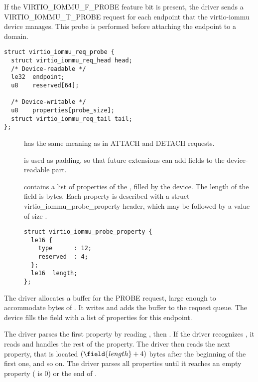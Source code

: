 If the VIRTIO_IOMMU_F_PROBE feature bit is present, the driver sends a
VIRTIO_IOMMU_T_PROBE request for each endpoint that the virtio-iommu
device manages. This probe is performed before attaching the endpoint to
a domain.

\begin{lstlisting}
struct virtio_iommu_req_probe {
  struct virtio_iommu_req_head head;
  /* Device-readable */
  le32  endpoint;
  u8    reserved[64];

  /* Device-writable */
  u8    properties[probe_size];
  struct virtio_iommu_req_tail tail;
};
\end{lstlisting}

\begin{description}
\item[] has the same meaning as in ATTACH and DETACH
  requests.

\item[] is used as padding, so that future extensions can
  add fields to the device-readable part.

\item[] contains a list of properties of the
  , filled by the device. The length of the
   field is  bytes. Each property is
  described with a struct virtio_iommu_probe_property header, which may be
  followed by a value of size .

\begin{lstlisting}
struct virtio_iommu_probe_property {
  le16 {
    type      : 12;
    reserved  : 4;
  };
  le16  length;
};
\end{lstlisting}

\end{description}

The driver allocates a buffer for the PROBE request, large enough to
accommodate  bytes of . It writes
 and adds the buffer to the request queue. The device
fills the  field with a list of properties for this
endpoint.

The driver parses the first property by reading , then
. If the driver recognizes , it reads and
handles the rest of the property. The driver then reads the next property,
that is located $(\field{length} + 4)$ bytes after the beginning of the
first one, and so on. The driver parses all properties until it reaches an
empty property ( is 0) or the end of .

